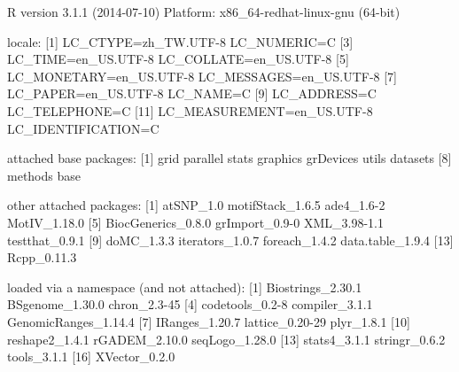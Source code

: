 \documentclass[a4paper,10pt]{article}
\begin{document}
\begin{Schunk}
\begin{Soutput}
R version 3.1.1 (2014-07-10)
Platform: x86_64-redhat-linux-gnu (64-bit)

locale:
 [1] LC_CTYPE=zh_TW.UTF-8       LC_NUMERIC=C              
 [3] LC_TIME=en_US.UTF-8        LC_COLLATE=en_US.UTF-8    
 [5] LC_MONETARY=en_US.UTF-8    LC_MESSAGES=en_US.UTF-8   
 [7] LC_PAPER=en_US.UTF-8       LC_NAME=C                 
 [9] LC_ADDRESS=C               LC_TELEPHONE=C            
[11] LC_MEASUREMENT=en_US.UTF-8 LC_IDENTIFICATION=C       

attached base packages:
[1] grid      parallel  stats     graphics  grDevices utils     datasets 
[8] methods   base     

other attached packages:
 [1] atSNP_1.0          motifStack_1.6.5   ade4_1.6-2         MotIV_1.18.0      
 [5] BiocGenerics_0.8.0 grImport_0.9-0     XML_3.98-1.1       testthat_0.9.1    
 [9] doMC_1.3.3         iterators_1.0.7    foreach_1.4.2      data.table_1.9.4  
[13] Rcpp_0.11.3       

loaded via a namespace (and not attached):
 [1] Biostrings_2.30.1    BSgenome_1.30.0      chron_2.3-45        
 [4] codetools_0.2-8      compiler_3.1.1       GenomicRanges_1.14.4
 [7] IRanges_1.20.7       lattice_0.20-29      plyr_1.8.1          
[10] reshape2_1.4.1       rGADEM_2.10.0        seqLogo_1.28.0      
[13] stats4_3.1.1         stringr_0.6.2        tools_3.1.1         
[16] XVector_0.2.0       
\end{Soutput}
\end{Schunk}


%


\end{document}
